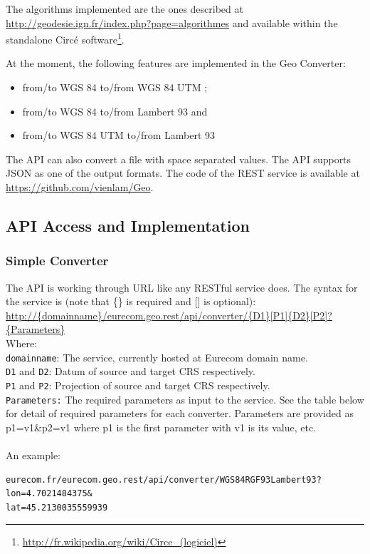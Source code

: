 The algorithms implemented are the ones described at \url{http://geodesie.ign.fr/index.php?page=algorithmes} and available within the standalone Circ\'e software\footnote{\url{http://fr.wikipedia.org/wiki/Circe_(logiciel)}}.

At the moment, the following features are implemented in the Geo Converter:
\begin{itemize}
\item from/to WGS 84 to/from WGS 84 UTM ;
\item from/to WGS 84  to/from Lambert 93 and 
\item from/to WGS 84 UTM to/from Lambert 93
\end{itemize}   

The API can also convert a file with space separated values. The API supports JSON as one of the output formats. The code of the REST service is available at \url{https://github.com/vienlam/Geo}.

 


\subsection{API Access and Implementation}
\label{sec:access}

\subsubsection{Simple Converter}
The API is working through URL like any RESTful service does. The syntax for the service is (note that \{\} is required and [] is optional):
\url{http://{domainname}/eurecom.geo.rest/api/converter/{D1}[P1]{D2}[P2]?{Parameters}} \\
Where: \\
\texttt{domainname}: The service, currently hosted at Eurecom domain name.\\
\texttt{D1} and \texttt{D2}: Datum of source and target CRS respectively.\\
\texttt{P1} and \texttt{P2}: Projection of source and target CRS respectively.\\
\texttt{Parameters:} The required parameters as input to the service. See the table below for detail of required parameters for each converter. Parameters are provided as p1=v1\&p2=v1 where p1 is the first parameter with v1 is its value, etc.\\
\\
An example:
\begin{verbatim}
eurecom.fr/eurecom.geo.rest/api/converter/WGS84RGF93Lambert93?lon=4.7021484375&
lat=45.2130035559939
\end{verbatim}

